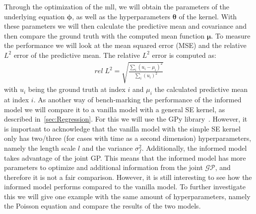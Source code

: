 \documentclass{article}
\begin{document}
Through the optimization of the mll, we will obtain the parameters of the
underlying equation $\bm{\phi}$, as well as the hyperparameters $\bm{\theta}$ of the
kernel. With these parameters we will then calculate the predictive mean and
covariance and then compare the ground truth with the computed mean function $\bm{\mu}$.
To measure the performance we will look at the mean squared error (MSE) and the relative $L^2$ error of the predictive mean. The relative $L^2$ error is computed as:
\begin{align}
     rel \; L^2 = \sqrt{\frac{\sum_i (u_i - \mu_i)^2}{\sum_i (u_i)^2}}
\end{align}
with $u_i$ being the ground truth at index $i$ and $\mu_i$ the calculated predictive mean at index $i$.
As another way of bench-marking  the performance of the informed model we will compare it to a
vanilla model with a general SE kernel, as described in~\ref{sec:Regression}.
For this we will use the GPy library~\cite{gpy2014}. However, it is important
to acknowledge that the vanilla model with the simple SE kernel only has two/three (for cases with time as a second dimension) hyperparameters, namely the length scale $l$ and the variance $\sigma_f^2$.
Additionally, the informed model takes advantage of the joint GP. This means
that the informed model has more parameters to optimize and additional
information from the joint $\mathcal{GP}$, and therefore it is not a fair comparison.
However, it is still interesting to see how the informed model performs
compared to the vanilla model. To further
investigate this we will give one example with the same amount of
hyperparameters, namely the Poisson equation and compare the results of the two
models.\\
\end{document}
